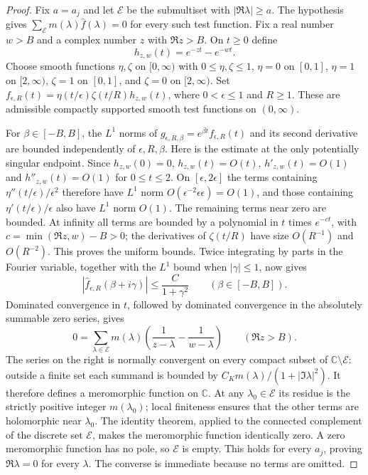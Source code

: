 \begin{proof}
Fix $a=a_j$ and let $\mathcal E$ be the submultiset with
$|\Re\lambda|\geq a$.  The hypothesis gives
$\sum_{\mathcal E}m(\lambda)\widehat f(\lambda)=0$ for every such test
function.  Fix a real number $w>B$ and a complex number $z$ with
$\Re z>B$.  On $t\geq0$ define
\[
 h_{z,w}(t)=e^{-zt}-e^{-wt}.
\]
Choose smooth functions $\eta,\zeta$ on $[0,\infty)$ with $0\leq\eta,\zeta
\leq1$, $\eta=0$ on $[0,1]$, $\eta=1$ on $[2,\infty)$, $\zeta=1$ on
$[0,1]$, and $\zeta=0$ on $[2,\infty)$.  Set
$f_{\epsilon,R}(t)=\eta(t/\epsilon)\zeta(t/R)h_{z,w}(t)$, where
$0<\epsilon\leq1$ and $R\geq1$.  These are admissible compactly supported
smooth test functions on $(0,\infty)$.

For $\beta\in[-B,B]$, the $L^1$ norms of
$g_{\epsilon,R,\beta}=e^{\beta t}f_{\epsilon,R}(t)$ and its second
derivative are bounded independently of $\epsilon,R,\beta$.  Here is the
estimate at the only potentially singular endpoint.  Since $h_{z,w}(0)=0$,
$h_{z,w}(t)=O(t)$, $h'_{z,w}(t)=O(1)$ and $h''_{z,w}(t)=O(1)$ for
$0\leq t\leq2$.  On $[\epsilon,2\epsilon]$ the terms containing
$\eta''(t/\epsilon)/\epsilon^2$ therefore have $L^1$ norm
$O(\epsilon^{-2}\epsilon\epsilon)=O(1)$, and those containing
$\eta'(t/\epsilon)/\epsilon$ also have $L^1$ norm $O(1)$.
The remaining terms near zero are bounded.  At infinity all terms are
bounded by a polynomial in $t$ times $e^{-ct}$, with
$c=\min(\Re z,w)-B>0$; the derivatives of $\zeta(t/R)$ have size
$O(R^{-1})$ and $O(R^{-2})$.  This proves the uniform bounds.
Twice integrating by parts in the Fourier variable, together with the
$L^1$ bound when $|\gamma|\leq1$, now gives
\[
 |\widehat f_{\epsilon,R}(\beta+i\gamma)|
 \leq\frac{C}{1+\gamma^2}
 \qquad(\beta\in[-B,B]).
\]
Dominated convergence in $t$, followed by dominated convergence in the
absolutely summable zero series, gives
\[
 0=\sum_{\lambda\in\mathcal E}m(\lambda)
       \left(\frac1{z-\lambda}-\frac1{w-\lambda}\right)
       \qquad(\Re z>B).
\]
The series on the right is normally convergent on every compact subset of
$\mathbb C\setminus\mathcal E$: outside a finite set each summand is bounded
by $C_Km(\lambda)/(1+|\Im\lambda|^2)$.  It therefore defines a
meromorphic function on $\mathbb C$.  At any $\lambda_0\in\mathcal E$
its residue is the strictly positive integer $m(\lambda_0)$; local finiteness
ensures that the other terms are holomorphic near $\lambda_0$.
The identity theorem, applied to the connected complement of the discrete
set $\mathcal E$, makes the meromorphic function identically zero.  A zero
meromorphic function has no pole, so $\mathcal E$ is empty.  This holds for
every $a_j$, proving $\Re\lambda=0$ for every $\lambda$.  The converse
is immediate because no terms are omitted.
\end{proof}

